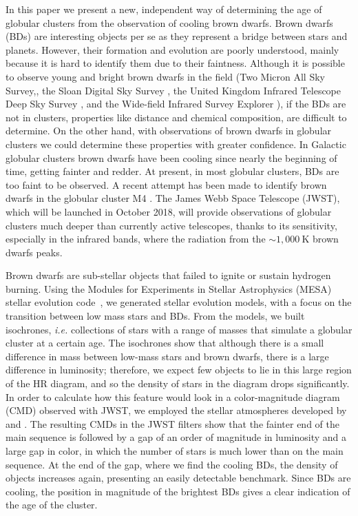 \documentclass[useAMS,usenatbib]{mnras}
\begin{document}
In this paper we present a new, independent way of determining the age of globular clusters from the observation of cooling brown dwarfs. Brown dwarfs (BDs) are interesting objects per se as they represent a bridge between stars and planets. However, their formation and evolution are poorly understood, mainly because it is hard to identify them due to their faintness. Although it is possible to observe young and bright brown dwarfs in the field  (Two Micron All Sky Survey,\citealt{2006AJ....131.1163S,1999AJ....118..997G}, the Sloan Digital Sky Survey
\citealt{2000AJ....120.1579Y,2002AJ....123.3409H}, the United Kingdom Infrared Telescope Deep Sky Survey \citealt{2007MNRAS.375..213W,2007MNRAS.374..372L,2010MNRAS.406.1885B}, and the Wide-field Infrared Survey Explorer \citealt{2010AJ....140.1868W,2011ApJS..197...19K}), if the BDs are not in clusters, properties like distance and chemical composition, are difficult to determine.  On the other hand, with observations of brown dwarfs in globular clusters we could determine these properties with greater confidence. In Galactic globular clusters brown dwarfs have been cooling since nearly the beginning of time, getting fainter and redder.  At present, in most globular clusters, BDs are too faint to be observed. A recent attempt has been made to identify brown dwarfs in the globular cluster M4 \citep{2013Natur.500...51H}. The James Webb Space Telescope (JWST), which will be launched in October 2018, will provide observations of globular clusters much deeper than currently active telescopes, thanks to its sensitivity, especially in the infrared bands, where the radiation from the $\sim 1,000~\mathrm{K}$ brown dwarfs peaks.

Brown dwarfs are sub-stellar objects that failed to ignite or sustain hydrogen burning. Using the Modules for Experiments in Stellar Astrophysics (MESA) stellar evolution code~\citep{2011ApJS..192....3P}, we generated stellar evolution models, with a focus on the transition between low mass stars and BDs. From the models, we built isochrones,  {\em i.e.} collections of stars with a range of masses that simulate a globular cluster at a certain age.  The isochrones show that although there is a small difference in mass between low-mass stars and brown dwarfs, there is a large difference in luminosity; therefore, we expect few objects to lie in this large region of the HR diagram, and so the density of stars in the diagram drops significantly.  In order to calculate how this feature would look in a color-magnitude diagram (CMD) observed with JWST, we employed the stellar atmospheres developed by \citet{2015A&A...577A..42B} and \citet{2016Allard}. The resulting CMDs in the JWST filters show that the fainter end of the main sequence is followed by a gap of an order of  magnitude in luminosity and a large gap in color, in which the number of stars is much lower than on the main sequence.  At the end of the gap, where we find the cooling BDs, the density of objects increases again, presenting an easily detectable benchmark. Since BDs are cooling, the position in magnitude of the brightest BDs gives a clear indication of the age of the cluster.
\end{document}

